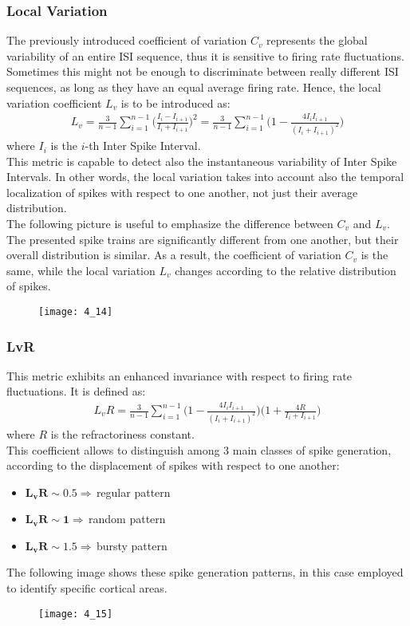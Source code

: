 \subsubsection{Local Variation}
The previously introduced coefficient of variation \(C_v\) represents the global
variability of an entire ISI sequence, thus it is sensitive to firing rate
fluctuations. Sometimes this might not be enough to discriminate between really
different ISI sequences, as long as they have an equal average firing rate. Hence,
the local variation coefficient \(L_v\) is to be introduced as:
\begin{align*}
    L_v
    =\frac{3}{n-1}\sum_{i=1}^{n-1}\biggl(\frac{I_{i}-I_{i+1}}{I_{i}+I_{i+1}}\biggr)^2
    =\frac{3}{n-1}\sum_{i=1}^{n-1}\biggl(1-\frac{4I_{i}I_{i+1}}{(I_{i}+I_{i+1})^2}\biggr)
\end{align*}
where \(I_i\) is the \(i\)-th Inter Spike Interval.\\
This metric is capable to detect also the instantaneous variability of Inter Spike
Intervals. In other words, the local variation takes into account also the
temporal localization of spikes with respect to one another, not just their
average distribution.\\
The following picture is useful to emphasize the difference between
\(C_v\) and \(L_v\). The presented spike trains are significantly different from
one another, but their overall distribution is similar. As a result, the
coefficient of variation \(C_v\) is the same, while the local variation \(L_v\)
changes according to the relative distribution of spikes.
\begin{figure}[H]
    \texttt{[image: 4\_14]}
    \centering
\end{figure}
\subsubsection{LvR}
This metric exhibits an enhanced invariance with respect to firing rate fluctuations.
It is defined as:
\begin{align*}
    L_{v}R
    =\frac{3}{n-1}\sum_{i=1}^{n-1}\biggl(1-\frac{4I_{i}I_{i+1}}{(I_{i}+I_{i+1})^2}\biggr)\biggl(1+\frac{4R}{I_{i}+I_{i+1}}\biggr)
\end{align*}
where \(R\) is the refractoriness constant.\\
This coefficient allows to distinguish among 3 main classes of spike generation,
according to the displacement of spikes with respect to one another:
\begin{itemize}
    \item \(\mathbf{L_{v}R\sim0.5}\Rightarrow\,\)regular pattern
    \item \(\mathbf{L_{v}R\sim1}\Rightarrow\,\)random pattern
    \item \(\mathbf{L_{v}R\sim1.5}\Rightarrow\,\)bursty pattern
\end{itemize}
The following image shows these spike generation patterns, in this case employed to identify specific cortical areas.
\begin{figure}[H]
    \texttt{[image: 4\_15]}
    \centering
\end{figure}

